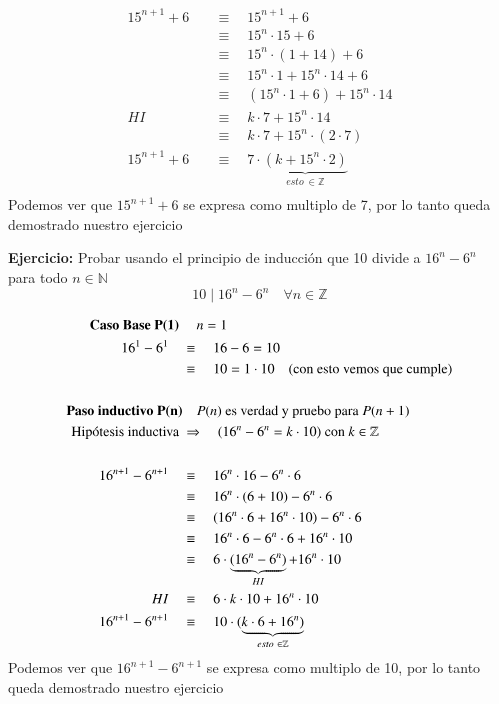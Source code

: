 \documentclass[12pt]{book}
\begin{document}
\begin{equation*}
\begin{split}
15^{n+1} + 6 \quad   &\equiv \quad  15^{n+1} + 6   \\
&\equiv  \quad   15^{n} \cdot 15 + 6  \\
&\equiv  \quad   15^{n} \cdot (1 + 14) + 6 \\
&\equiv  \quad   15^{n} \cdot 1 + 15^{n} \cdot 14 + 6 \\ 
&\equiv  \quad   (15^{n} \cdot 1 + 6) +15^{n} \cdot 14  \\
HI \quad   &\equiv  \quad   k \cdot 7 +15^{n} \cdot 14  \\
\quad   &\equiv  \quad   k \cdot 7 +15^{n} \cdot (2 \cdot 7)  \\
15^{n+1} + 6 \quad   &\equiv  \quad  7 \cdot \underbrace{ (k +15^{n} \cdot 2)}_{ esto \ \in \mathbb{Z}}  \\
\end{split}
\end{equation*}
Podemos ver que $ 15^{n+1} + 6  $ se expresa como multiplo de 7, por lo tanto queda demostrado nuestro ejercicio

\begin{shaded}
\textbf{Ejercicio:} Probar usando el principio de inducción que 10 divide a $ 16^{n} - 6^{n}$ \\ para todo $n \in \mathbb N$  \\
\[	
	10  \mid 16^{n} - 6^{n} \quad \forall n \in \mathbb{Z}
\]
\end{shaded}

\begin{equation*}
\begin{split}
\textbf{Caso Base P(1) } & \quad n=1 \\
16^{1} - 6^{1} \quad   &\equiv \quad  16 - 6 = 10 \\
&\equiv \quad  10 = 1 \cdot 10 \text{\quad (con esto vemos que cumple)}\\ \\
\textbf{Paso inductivo P(n)} & \quad P(n) \text { es verdad y pruebo para } P(n+1)	\\
\text{Hip\'otesis inductiva } &\Rightarrow \quad (16^{n} - 6^{n} = k \cdot 10) \text{ con } k \in \mathbb{Z}\\ \\
16^{n+1} - 6^{n+1} \quad &\equiv  \quad   16^{n} \cdot 16 - 6^{n} \cdot 6  \\
&\equiv  \quad   16^{n} \cdot (6+10) - 6^{n} \cdot 6  \\
&\equiv  \quad   (16^{n} \cdot 6 + 16^{n} \cdot10) - 6^{n} \cdot 6  \\
&\equiv  \quad    16^{n} \cdot 6 - 6^{n} \cdot 6  +  16^{n} \cdot 10 \\
&\equiv  \quad   6 \cdot \underbrace{ (16^{n} - 6^{n}) }_{HI}  +  16^{n} \cdot 10 \\
HI \quad   &\equiv  \quad  6 \cdot k \cdot 10 + 16^{n} \cdot 10 \\
16^{n+1} - 6^{n+1} \quad  &\equiv  \quad  10 \cdot (\underbrace{  k \cdot 6 + 16^{n})}_{ esto \ \in \mathbb{Z}}  
\end{split}
\end{equation*}
Podemos ver que $ 16^{n+1} - 6^{n+1} $ se expresa como multiplo de 10, por lo tanto queda demostrado nuestro ejercicio
\end{document}

